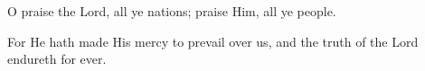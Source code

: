 O praise the Lord, all ye nations; praise Him, all ye people. 

For He hath made His mercy to prevail over us, and the truth of the Lord endureth for ever.
